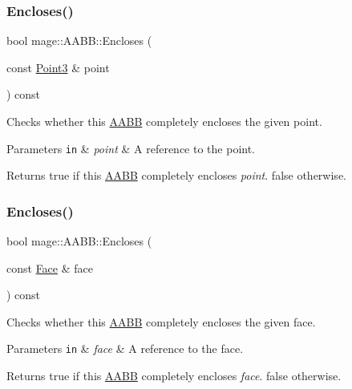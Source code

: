\subsubsection{\texorpdfstring{Encloses()}{Encloses()}\hspace{0.1cm}{\footnotesize\ttfamily [2/3]}}
{\footnotesize\ttfamily bool mage\+::\+A\+A\+B\+B\+::\+Encloses (\begin{DoxyParamCaption}\item[{const \hyperlink{structmage_1_1_point3}{Point3} \&}]{point }\end{DoxyParamCaption}) const}

Checks whether this \hyperlink{structmage_1_1_a_a_b_b}{A\+A\+BB} completely encloses the given point.


\begin{DoxyParams}[1]{Parameters}
\mbox{\tt in}  & {\em point} & A reference to the point. \\
\hline
\end{DoxyParams}
\begin{DoxyReturn}{Returns}
{\ttfamily true} if this \hyperlink{structmage_1_1_a_a_b_b}{A\+A\+BB} completely encloses {\itshape point}. {\ttfamily false} otherwise. 
\end{DoxyReturn}
\hypertarget{structmage_1_1_a_a_b_b_ab57318f2ea79779ed357a7ecdd101132}{}\label{structmage_1_1_a_a_b_b_ab57318f2ea79779ed357a7ecdd101132} 
\subsubsection{\texorpdfstring{Encloses()}{Encloses()}\hspace{0.1cm}{\footnotesize\ttfamily [3/3]}}
{\footnotesize\ttfamily bool mage\+::\+A\+A\+B\+B\+::\+Encloses (\begin{DoxyParamCaption}\item[{const \hyperlink{structmage_1_1_face}{Face} \&}]{face }\end{DoxyParamCaption}) const}

Checks whether this \hyperlink{structmage_1_1_a_a_b_b}{A\+A\+BB} completely encloses the given face.


\begin{DoxyParams}[1]{Parameters}
\mbox{\tt in}  & {\em face} & A reference to the face. \\
\hline
\end{DoxyParams}
\begin{DoxyReturn}{Returns}
{\ttfamily true} if this \hyperlink{structmage_1_1_a_a_b_b}{A\+A\+BB} completely encloses {\itshape face}. {\ttfamily false} otherwise. 
\end{DoxyReturn}
\hypertarget{structmage_1_1_a_a_b_b_a3bb59de6eca634cb3ddec4ad314fde21}{}\label{structmage_1_1_a_a_b_b_a3bb59de6eca634cb3ddec4ad314fde21} 
